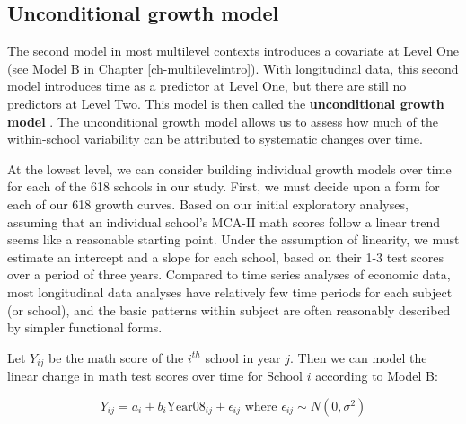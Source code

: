 \documentclass[
]{krantz}
\begin{document}
\hypertarget{modelb9}{%
\subsection{Unconditional growth model}\label{modelb9}}

The second model in most multilevel contexts introduces a covariate at Level One (see Model B in Chapter \ref{ch-multilevelintro}). With longitudinal data, this second model introduces time as a predictor at Level One, but there are still no predictors at Level Two. This model is then called the \textbf{unconditional growth model} . The unconditional growth model allows us to assess how much of the within-school variability can be attributed to systematic changes over time.

At the lowest level, we can consider building individual growth models over time for each of the 618 schools in our study. First, we must decide upon a form for each of our 618 growth curves. Based on our initial exploratory analyses, assuming that an individual school's MCA-II math scores follow a linear trend seems like a reasonable starting point. Under the assumption of linearity, we must estimate an intercept and a slope for each school, based on their 1-3 test scores over a period of three years. Compared to time series analyses of economic data, most longitudinal data analyses have relatively few time periods for each subject (or school), and the basic patterns within subject are often reasonably described by simpler functional forms.

Let \(Y_{ij}\) be the math score of the \(i^{th}\) school in year \(j\). Then we can model the linear change in math test scores over time for School \(i\) according to Model B:

\begin{equation*}
Y_{ij} = a_{i} + b_{i}\textrm{Year08}_{ij} + \epsilon_{ij} \textrm{ where } \epsilon_{ij} \sim N(0, \sigma^2)
\end{equation*}
\end{document}
